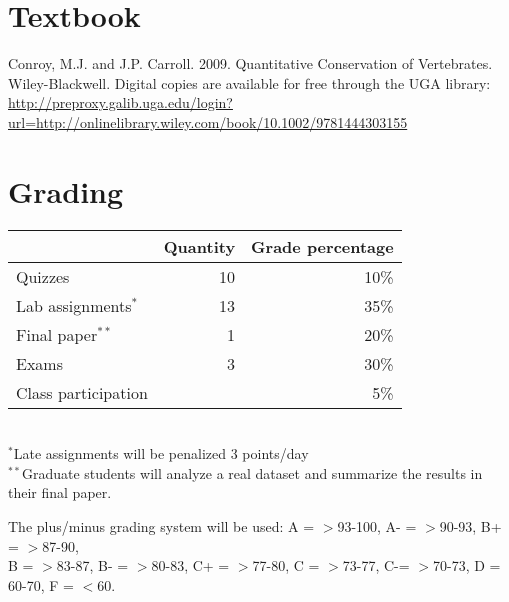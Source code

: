 \documentclass[12pt]{article}
\begin{document}
\vspace{-3mm}
\section*{\normalsize Textbook}
\vspace{-4mm}
Conroy, M.J. and J.P. Carroll. 2009. Quantitative Conservation of
Vertebrates. Wiley-Blackwell.
Digital copies are available for free through the UGA library:
{\footnotesize \url{http://preproxy.galib.uga.edu/login?url=http://onlinelibrary.wiley.com/book/10.1002/9781444303155}}

\vspace{-3mm}
\section*{\normalsize Grading}
\vspace{-4mm}
\begin{center}
  \begin{tabular}[h!]{lrr}
    \hline
                              & Quantity & Grade percentage      \\
    \hline
    Quizzes                   & 10       & 10\%                  \\
    Lab assignments$^*$       & 13       & 35\%                  \\
    Final paper$^{**}$         & 1        & 20\%                  \\
    Exams                     & 3        & 30\%                  \\
    Class participation       &          & 5\%                   \\
    \hline
  \end{tabular}                                                  \\
  \small
\hspace{0mm} $^*$Late assignments will be penalized 3 points/day \\ 
\hspace{0mm} $^{**}$Graduate students will analyze a real dataset and
summarize the results in their final paper.
\end{center}
\vspace{-6pt}
{%
The plus/minus grading system will be used: %
A = $>$93-100, A- = $>$90-93, B+ = $>$87-90, \\ B = $>$83-87,
B- = $>$80-83, C+ = $>$77-80, C = $>$73-77, C-= $>$70-73, D = 60-70, F = $<$60. 
}
\end{document}
